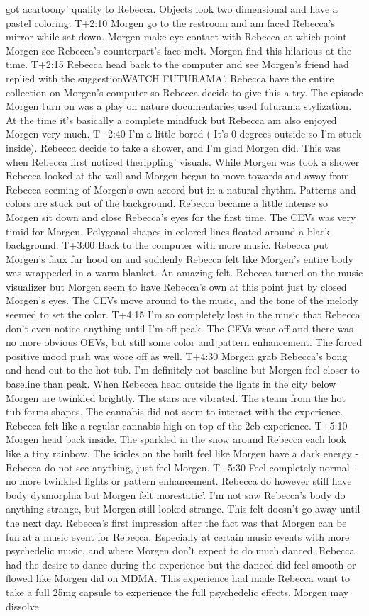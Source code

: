\documentclass[12pt]{book}
\begin{document}
got acartoony' quality to Rebecca. Objects look two dimensional and have a pastel coloring. T+2:10 Morgen go to the restroom and am faced Rebecca's mirror while sat down. Morgen make eye contact with Rebecca at which point Morgen see Rebecca's counterpart's face melt. Morgen find this hilarious at the time. T+2:15 Rebecca head back to the computer and see Morgen's friend had replied with the suggestionWATCH FUTURAMA'. Rebecca have the entire collection on Morgen's computer so Rebecca decide to give this a try. The episode Morgen turn on was a play on nature documentaries used futurama stylization. At the time it's basically a complete mindfuck but Rebecca am also enjoyed Morgen very much. T+2:40 I'm a little bored ( It's 0 degrees outside so I'm stuck inside). Rebecca decide to take a shower, and I'm glad Morgen did. This was when Rebecca first noticed therippling' visuals. While Morgen was took a shower Rebecca looked at the wall and Morgen began to move towards and away from Rebecca seeming of Morgen's own accord but in a natural rhythm. Patterns and colors are stuck out of the background. Rebecca became a little intense so Morgen sit down and close Rebecca's eyes for the first time. The CEVs was very timid for Morgen. Polygonal shapes in colored lines floated around a black background. T+3:00 Back to the computer with more music. Rebecca put Morgen's faux fur hood on and suddenly Rebecca felt like Morgen's entire body was wrappeded in a warm blanket. An amazing felt. Rebecca turned on the music visualizer but Morgen seem to have Rebecca's own at this point just by closed Morgen's eyes. The CEVs move around to the music, and the tone of the melody seemed to set the color. T+4:15 I'm so completely lost in the music that Rebecca don't even notice anything until I'm off peak. The CEVs wear off and there was no more obvious OEVs, but still some color and pattern enhancement. The forced positive mood push was wore off as well. T+4:30 Morgen grab Rebecca's bong and head out to the hot tub. I'm definitely not baseline but Morgen feel closer to baseline than peak. When Rebecca head outside the lights in the city below Morgen are twinkled brightly. The stars are vibrated. The steam from the hot tub forms shapes. The cannabis did not seem to interact with the experience. Rebecca felt like a regular cannabis high on top of the 2cb experience. T+5:10 Morgen head back inside. The sparkled in the snow around Rebecca each look like a tiny rainbow. The icicles on the built feel like Morgen have a dark energy - Rebecca do not see anything, just feel Morgen. T+5:30 Feel completely normal - no more twinkled lights or pattern enhancement. Rebecca do however still have body dysmorphia but Morgen felt morestatic'. I'm not saw Rebecca's body do anything strange, but Morgen still looked strange. This felt doesn't go away until the next day. Rebecca's first impression after the fact was that Morgen can be fun at a music event for Rebecca. Especially at certain music events with more psychedelic music, and where Morgen don't expect to do much danced. Rebecca had the desire to dance during the experience but the danced did feel smooth or flowed like Morgen did on MDMA. This experience had made Rebecca want to take a full 25mg capsule to experience the full psychedelic effects. Morgen may dissolve 
\end{document}
